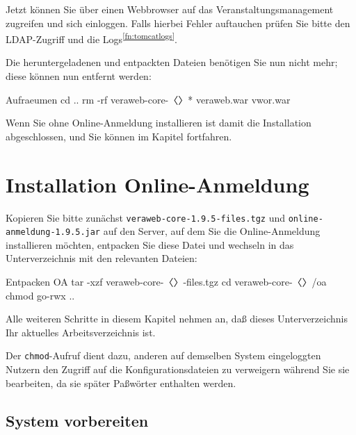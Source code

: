\documentclass{tarentanleitung}
\newcommand{\vwiaverssw}{1.9.5}
\begin{document}
Jetzt können Sie über einen Webbrowser auf das Veranstaltungsmanagement
zugreifen und sich einloggen. Falls hierbei Fehler auftauchen prüfen Sie
bitte den LDAP-Zugriff und die Logs\Hair\textsuperscript{\ref{fn:tomcatlogs}}.

\begin{minipage}{\linewidth}
Die heruntergeladenen und entpackten Dateien benötigen Sie nun nicht
mehr; diese können nun entfernt werden:

\begin{lstdump}{Aufraeumen}
cd ..
rm -rf veraweb-core-〈\lstdumpesc{\vwiaverssw}〉* veraweb.war vwor.war
\end{lstdump}
\end{minipage}

Wenn Sie ohne Online-Anmeldung installieren ist damit die Installation
abgeschlossen, und Sie können im Kapitel  fortfahren.

\section{Installation Online-Anmeldung}\label{sec:setup-oa}

\begin{minipage}{\linewidth}
Kopieren Sie bitte zunächst \texttt{veraweb-core-\vwiaverssw{}-files.tgz}
und \texttt{online-anmeldung-\vwiaverssw{}.jar}
auf den Server, auf dem Sie die Online-Anmeldung installieren möchten,
entpacken Sie diese Datei und wechseln in das Unterverzeichnis mit den
relevanten Dateien:

\begin{lstdump}{Entpacken OA}
tar -xzf veraweb-core-〈\lstdumpesc{\vwiaverssw}〉-files.tgz
cd veraweb-core-〈\lstdumpesc{\vwiaverssw}〉/oa
chmod go-rwx ..
\end{lstdump}
\end{minipage}

Alle weiteren Schritte in diesem Kapitel nehmen an, daß dieses
Unterverzeichnis Ihr aktuelles Arbeitsverzeichnis ist.

Der \texttt{chmod}-Aufruf dient dazu, anderen auf demselben System
eingeloggten Nutzern den Zugriff auf die Konfigurationsdateien zu
verweigern während Sie sie bearbeiten, da sie später Paßwörter
enthalten werden.

\subsection{System vorbereiten}\label{subsec:setup-oa-prep}
\end{document}

